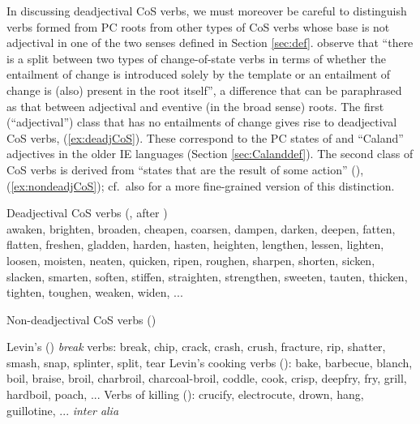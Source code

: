\documentclass[output=paper,colorlinks,citecolor=brown]{langscibook}
\begin{document}
In discussing deadjectival  CoS  verbs, we must moreover be careful to distinguish verbs formed from PC roots from other types of CoS verbs whose base is not adjectival in one of the two senses defined in Section \ref{sec:def}. \citet[58]{BeaversKoontz2020} observe that ``there is a split between two types of change-of-state verbs in terms of whether the entailment of change is introduced solely by the
template or an entailment of change is (also) present in the root itself'', a difference that can be paraphrased as that between adjectival  and eventive (in the broad sense) roots. The first (``adjectival'') class that has no entailments of change gives rise to deadjectival  CoS  verbs, (\ref{ex:deadjCoS}). These correspond to the PC states of \citet{Dixon1982} and ``Caland'' adjectives  in the older IE languages (Section \ref{sec:Calanddef}). The second class of CoS  verbs is derived from ``states that are the result of some action'' (\citealt[50]{Dixon1982}), (\ref{ex:nondeadjCoS}); cf.\ also \citealt{Rau2013} for a more fine-grained version of this distinction.

\begin{exe}
\ex   \label{ex:deadjCoS} Deadjectival CoS  verbs (\citealt[245]{Levin1993}, after \citealt[58]{BeaversKoontz2020})\\
awaken, brighten, broaden, cheapen, coarsen, dampen, darken, deepen,
fatten, flatten, freshen, gladden, harden, hasten, heighten, lengthen, lessen,
lighten, loosen, moisten, neaten, quicken, ripen, roughen, sharpen, shorten,
sicken, slacken, smarten, soften, stiffen, straighten, strengthen, sweeten,
tauten, thicken, tighten, toughen, weaken, widen, ...
\end{exe}

\begin{exe}
\ex   \label{ex:nondeadjCoS} Non-deadjectival CoS  verbs (\citealt[58]{BeaversKoontz2020})
\begin{xlist}
    \ex  Levin's (\citeyear[241]{Levin1993}) \textit{break} verbs: break, chip, crack, crash, crush, fracture,
rip, shatter, smash, snap, splinter, split, tear
\ex Levin's cooking verbs (\citealt[243]{Levin1993}): bake, barbecue, blanch, boil, braise, broil, charbroil, charcoal-broil, coddle, cook, crisp, deepfry, fry, grill, hardboil, poach, ...
\ex Verbs of killing (\citealt[230--233]{Levin1993}): crucify, electrocute, drown, hang, guillotine, ...
\ex \textit{inter alia}
\end{xlist}
\end{exe}
\end{document}

